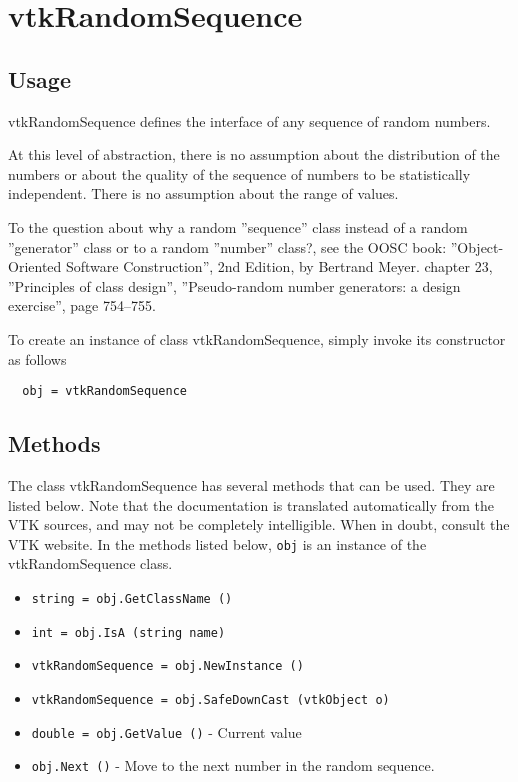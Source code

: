 \section{vtkRandomSequence}

\subsection{Usage}

 vtkRandomSequence defines the interface of any sequence of random numbers.

 At this level of abstraction, there is no assumption about the distribution
 of the numbers or about the quality of the sequence of numbers to be
 statistically independent. There is no assumption about the range of values.

 To the question about why a random ''sequence'' class instead of a random
 ''generator'' class or to a random ''number'' class?,
 see the OOSC book:
 ''Object-Oriented Software Construction'', 2nd Edition, by Bertrand Meyer.
 chapter 23, ''Principles of class design'', ''Pseudo-random number generators:
 a design exercise'', page 754--755.

To create an instance of class vtkRandomSequence, simply
invoke its constructor as follows
\begin{verbatim}
  obj = vtkRandomSequence
\end{verbatim}
\subsection{Methods}

The class vtkRandomSequence has several methods that can be used.
  They are listed below.
Note that the documentation is translated automatically from the VTK sources,
and may not be completely intelligible.  When in doubt, consult the VTK website.
In the methods listed below, \verb|obj| is an instance of the vtkRandomSequence class.
\begin{itemize}
\item  \verb|string = obj.GetClassName ()|

\item  \verb|int = obj.IsA (string name)|

\item  \verb|vtkRandomSequence = obj.NewInstance ()|

\item  \verb|vtkRandomSequence = obj.SafeDownCast (vtkObject o)|

\item  \verb|double = obj.GetValue ()| -  Current value

\item  \verb|obj.Next ()| -  Move to the next number in the random sequence.

\end{itemize}
